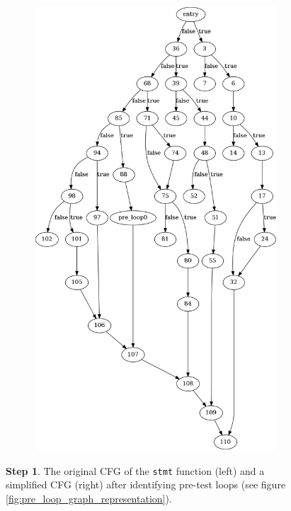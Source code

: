 \begin{figure}[htbp]
\begin{subfigure}[ht]{0.45\textwidth}
		\includegraphics[width=\textwidth]{inc/appendices/control_flow_analysis_example/stmt_1.png}
	\end{subfigure}
	\caption{\textbf{Step 1}. The original CFG of the \texttt{stmt} function (left) and a simplified CFG (right) after identifying pre-test loops (see figure \ref{fig:pre_loop_graph_representation}).}
	\label{fig:step_1}
\end{figure}

